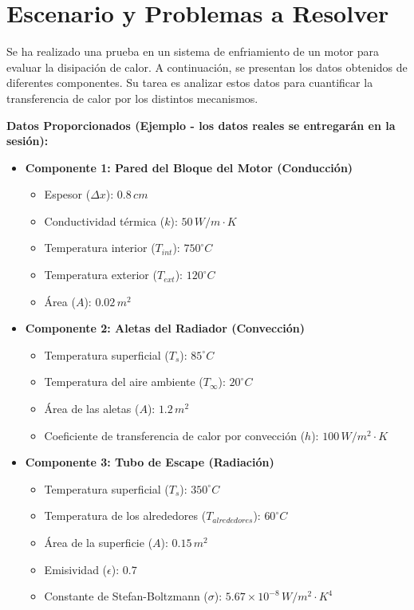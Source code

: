 \documentclass{article}
\begin{document}
\section*{Escenario y Problemas a Resolver}

Se ha realizado una prueba en un sistema de enfriamiento de un motor para evaluar la disipación de calor. A continuación, se presentan los datos obtenidos de diferentes componentes. Su tarea es analizar estos datos para cuantificar la transferencia de calor por los distintos mecanismos.

\textbf{Datos Proporcionados (Ejemplo - los datos reales se entregarán en la sesión):}

\begin{itemize}
    \item \textbf{Componente 1: Pared del Bloque del Motor (Conducción)}
    \begin{itemize}
        \item Espesor ($\Delta x$): $0.8 \, cm$
        \item Conductividad térmica ($k$): $50 \, W/m \cdot K$
        \item Temperatura interior ($T_{int}$): $750^\circ C$
        \item Temperatura exterior ($T_{ext}$): $120^\circ C$
        \item Área ($A$): $0.02 \, m^2$
    \end{itemize}

    \item \textbf{Componente 2: Aletas del Radiador (Convección)}
    \begin{itemize}
        \item Temperatura superficial ($T_s$): $85^\circ C$
        \item Temperatura del aire ambiente ($T_\infty$): $20^\circ C$
        \item Área de las aletas ($A$): $1.2 \, m^2$
        \item Coeficiente de transferencia de calor por convección ($h$): $100 \, W/m^2 \cdot K$
    \end{itemize}

    \item \textbf{Componente 3: Tubo de Escape (Radiación)}
    \begin{itemize}
        \item Temperatura superficial ($T_s$): $350^\circ C$
        \item Temperatura de los alrededores ($T_{alrededores}$): $60^\circ C$
        \item Área de la superficie ($A$): $0.15 \, m^2$
        \item Emisividad ($\epsilon$): $0.7$
        \item Constante de Stefan-Boltzmann ($\sigma$): $5.67 \times 10^{-8} \, W/m^2 \cdot K^4$
    \end{itemize}
\end{itemize}
\end{document}
